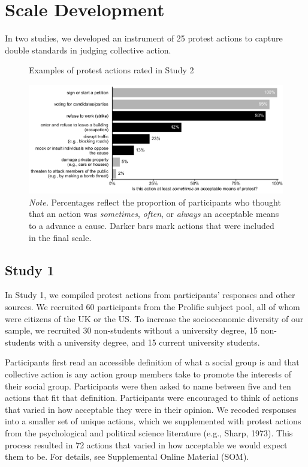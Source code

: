 \documentclass[12pt, letterpaper]{article}
\begin{document}
\hypertarget{scale-development}{%
\section{Scale Development}\label{scale-development}}

In two studies, we developed an instrument of 25 protest actions to
capture double standards in judging collective action.

\begin{figure}[!t]
\centering
\caption{Examples of protest actions rated in Study 2}
\includegraphics[scale=1]{../Scale Development/figures/figure-2}
\caption*{\textit{Note.} Percentages reflect the proportion of participants who thought that an action was \textit{sometimes}, \textit{often}, or \textit{always} an acceptable means to a advance a cause. Darker bars mark actions that were included in the final scale.}
\label{fig:f2}
\end{figure}

\hypertarget{study-1}{%
\subsection{Study 1}\label{study-1}}

In Study 1, we compiled protest actions from participants' responses and
other sources. We recruited 60 participants from the Prolific subject
pool, all of whom were citizens of the UK or the US. To increase the
socioeconomic diversity of our sample, we recruited 30 non-students
without a university degree, 15 non-students with a university degree,
and 15 current university students.

Participants first read an accessible definition of what a social group
is and that collective action is any action group members take to
promote the interests of their social group. Participants were then
asked to name between five and ten actions that fit that definition.
Participants were encouraged to think of actions that varied in how
acceptable they were in their opinion. We recoded responses into a
smaller set of unique actions, which we supplemented with protest
actions from the psychological and political science literature (e.g.,
Sharp, 1973). This process resulted in 72 actions that varied in how
acceptable we would expect them to be. For details, see Supplemental
Online Material (SOM).
\end{document}

